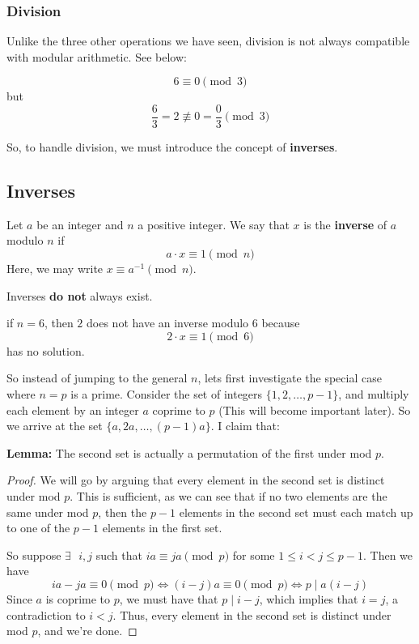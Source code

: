 \documentclass{article}
\theoremstyle{mytheoremstyle}
\theoremstyle{mytheoremstyle}
\theoremstyle{myproblemstyle}
\theoremstyle{myproblemstyle}
\theoremstyle{myproblemstyle}
\begin{document}
    \subsubsection{Division}
    Unlike the three other operations we have seen, division is not always compatible with modular arithmetic. See below: 
    \begin{example}
        $$6 \equiv 0 \pmod{3}$$ but $$\frac{6}{3} = 2 \not\equiv 0 = \frac{0}{3} \pmod{3}$$
    \end{example}
    So, to handle division, we must introduce the concept of \textbf{inverses}.

    \subsection{Inverses}
    \begin{definition}[Inverses]
        Let $a$ be an integer and $n$ a positive integer. We say that $x$ is the \textbf{inverse} of $a$ modulo $n$ if $$a \cdot x \equiv 1 \pmod{n}$$
        Here, we may write $x \equiv a^{-1} \pmod{n}$.
    \end{definition}

    Inverses \textbf{do not} always exist. 
    
    \begin{example}
        if $n = 6$, then $2$ does not have an inverse modulo $6$ because $$2 \cdot x \equiv 1 \pmod{6}$$ has no solution.
    \end{example}
    
    \vspace{3pt}
    So instead of jumping to the general $n$, lets first investigate the special case where $n=p$ is a prime. 
    \vspace{3pt}
    Consider the set of integers $\{1, 2, \ldots, p-1\}$, and multiply each element by an integer $a$ coprime to $p$ (This will become important later). So we arrive at the set $\{a, 2a, \ldots, (p-1)a\}$. I claim that:
    \vspace{5pt}

    \textbf{Lemma:} The second set is actually a permutation of the first under mod $p$. 
    
    \begin{proof}
    We will go by arguing that every element in the second set is distinct under mod $p$. This is sufficient, as we can see that if no two elements are the same under mod $p$, then the $p-1$ elements in the second set must each match up to one of the $p-1$ elements in the first set.
    
    So suppose $\exists \text{ }i, j$ such that $ia \equiv ja \pmod{p}$ for some $1 \leq i < j \leq p-1$. Then we have $$ia - ja \equiv 0 \pmod{p} \iff (i-j)a \equiv 0 \pmod{p} \iff p \mid a(i - j)$$ Since $a$ is coprime to $p$, we must have that $p \mid i - j$, which implies that $i = j$, a contradiction to $i < j$. Thus, every element in the second set is distinct under mod $p$, and we're done.
    \end{proof}
\end{document}
